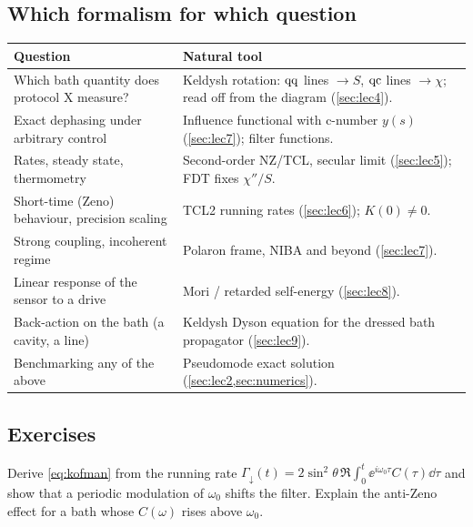 \subsection{Which formalism for which question}

\begin{center}
\small
\renewcommand{\arraystretch}{1.25}
\begin{tabularx}{\textwidth}{>{\raggedright\arraybackslash}p{4.2cm}>{\raggedright\arraybackslash}X}
\toprule
\textbf{Question} & \textbf{Natural tool}\\
\midrule
Which bath quantity does protocol X measure? & Keldysh rotation: $\mathrm{q}\mathrm{q}$ lines $\to S$, $\mathrm{q}\mathrm{c}$ lines $\to\chi$; read off from the diagram (\cref{sec:lec4}).\\
Exact dephasing under arbitrary control & Influence functional with c-number $y(s)$ (\cref{sec:lec7}); filter functions.\\
Rates, steady state, thermometry & Second-order NZ/TCL, secular limit (\cref{sec:lec5}); FDT fixes $\chi''/S$.\\
Short-time (Zeno) behaviour, precision scaling & TCL2 running rates (\cref{sec:lec6}); $K(0)\neq0$.\\
Strong coupling, incoherent regime & Polaron frame, NIBA and beyond (\cref{sec:lec7}).\\
Linear response of the sensor to a drive & Mori / retarded self-energy (\cref{sec:lec8}).\\
Back-action on the bath (a cavity, a line) & Keldysh Dyson equation for the dressed bath propagator (\cref{sec:lec9}).\\
Benchmarking any of the above & Pseudomode exact solution (\cref{sec:lec2,sec:numerics}).\\
\bottomrule
\end{tabularx}
\end{center}

\subsection{Exercises}

\begin{exercise}\label{ex:10-1}
Derive \cref{eq:kofman} from the running rate $\Gamma_\downarrow(t)=2\sin^2\theta\,\Re\int_0^t\ee^{i\omega_0\tau}C(\tau)\dd\tau$ and show that a periodic modulation of $\omega_0$ shifts the filter.
Explain the anti-Zeno effect for a bath whose $C(\omega)$ rises above $\omega_0$.
\end{exercise}

